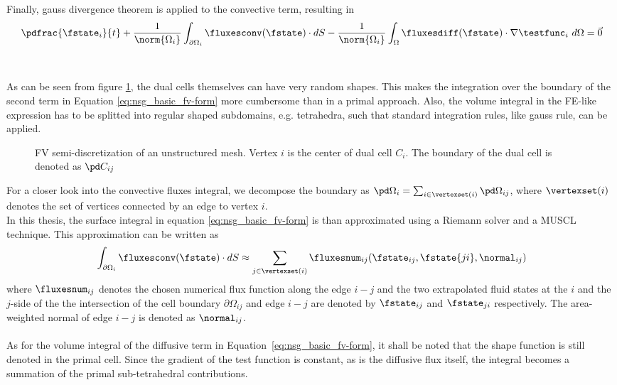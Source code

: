 \documentclass[../main.tex]{subfiles}
\begin{document}
Finally, gauss divergence theorem is applied to the convective term, resulting in
\begin{align}\label{eq:nsg_basic_fv-form}
\pdfrac{\fstate_i}{t} +
\frac{1}{\norm{\Omega_i}} \int_{\partial\Omega_i} \fluxesconv(\fstate)\cdot dS -
\frac{1}{\norm{\Omega_i}} \int_\Omega \fluxesdiff(\fstate)\cdot\nabla\testfunc_i ~d\Omega  =
\vec{0}
\end{align}
 \\
 \\
As can be seen from figure \ref{fig:dualcell_unstructured}, the dual cells themselves can have very random shapes. This makes the integration over the boundary of the second term in Equation \eqref{eq:nsg_basic_fv-form} more cumbersome than in a primal approach. Also, the volume integral in the \ac{FE}-like expression has to be splitted into regular shaped subdomains, e.g. tetrahedra, such that standard integration rules, like gauss rule, can be applied.




\begin{figure}[h]
\centering

\caption{\ac{FV} semi-discretization of an unstructured mesh. Vertex $i$ is the center of dual cell $C_i$. The boundary of the dual cell is denoted as $\pd C_{ij}$}
\label{fig:dualcell_unstructured}
\end{figure}


For a closer look into the convective fluxes integral, we decompose the boundary as $\pd \Omega_i = \sum_{i \in \vertexset(i)} \pd\Omega_{ij}$, where $\vertexset(i)$ denotes the set of vertices connected by an edge to vertex $i$.\\
In this thesis, the surface integral in equation \eqref{eq:nsg_basic_fv-form} is than approximated using a Riemann solver and a \ac{MUSCL} \cite{VanLeer1979} technique. This approximation can be written as
\begin{align}
\int_{\partial\Omega_i} \fluxesconv(\fstate)\cdot dS \approx
\sum_{j \in \vertexset(i)} \fluxesnum_{ij}(\fstate_{ij},\fstate{ji},\normal_{ij})
\end{align}
where $\fluxesnum_{ij}$ denotes the chosen numerical flux function along the edge $i-j$ and the two extrapolated fluid states at the $i$ and the $j$-side of the the intersection of the cell boundary $\partial \Omega_{ij}$ and edge $i-j$ are denoted by $\fstate_{ij}$ and $\fstate_{ji}$ respectively. The area-weighted normal of edge $i-j$ is denoted as $\normal_{ij}$.
 \\
 \\
As for the volume integral of the diffusive term in Equation~\eqref{eq:nsg_basic_fv-form}, it shall be noted that the shape function is still denoted in the primal cell. Since the gradient of the test function is constant, as is the diffusive flux itself, the integral becomes a summation of the primal sub-tetrahedral contributions.
\end{document}
